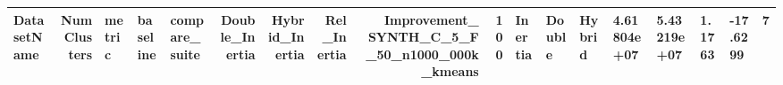 \begin{tabular}{lrlllrrrrr}
\toprule
DatasetName & NumClusters & metric & baseline & compare_suite & Double_Inertia & Hybrid_Inertia & Rel_Inertia & Improvement_%
\midrule
SYNTH_C_5_F_50_n1000_000k_kmeans & 100 & Inertia & Double & Hybrid & 4.61804e+07 & 5.43219e+07 & 1.1763 & -17.6299 & 7 \\
\bottomrule
\end{tabular}
